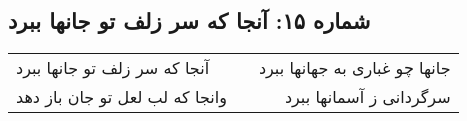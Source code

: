 \begin{center}
\section*{شماره ۱۵: آنجا که سر زلف تو جانها ببرد}
\label{sec:015}
\begin{longtable}{l p{0.5cm} r}
آنجا که سر زلف تو جانها ببرد
&&
جانها چو غباری به جهانها ببرد
\\
وانجا که لب لعل تو جان باز دهد
&&
سرگردانی ز آسمانها ببرد
\\
\end{longtable}
\end{center}
